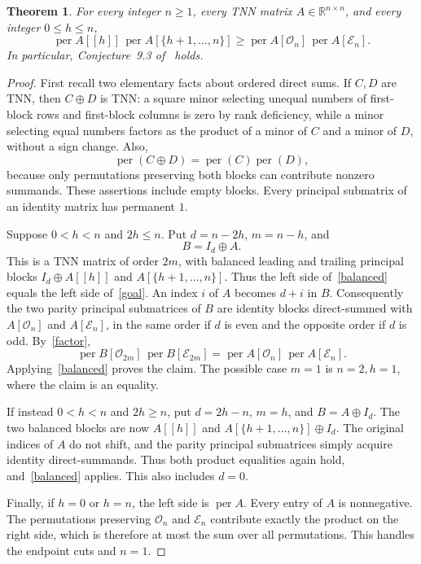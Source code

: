\documentclass[11pt]{article}
\newcommand{\per}{\operatorname{per}}
\newcommand{\OO}{\mathcal O}
\newcommand{\EE}{\mathcal E}
\newtheorem{theorem}{Theorem}
\begin{document}
\begin{theorem}\label{main}
For every integer $n\geq1$, every TNN matrix $A\in\mathbb R^{n\times n}$, and every integer $0\leq h\leq n$,
\begin{equation}\label{goal}
\per A[[h]]\,\per A[\{h+1,\dots,n\}]
\geq\per A[\OO_n]\,\per A[\EE_n].
\end{equation}
In particular, Conjecture~9.3 of~\cite{PSW} holds.
\end{theorem}
\begin{proof}
First recall two elementary facts about ordered direct sums. If $C,D$ are TNN, then $C\oplus D$ is TNN: a square minor selecting unequal numbers of first-block rows and first-block columns is zero by rank deficiency, while a minor selecting equal numbers factors as the product of a minor of $C$ and a minor of $D$, without a sign change. Also,
\begin{equation}\label{factor}
\per(C\oplus D)=\per(C)\per(D),
\end{equation}
because only permutations preserving both blocks can contribute nonzero summands. These assertions include empty blocks. Every principal submatrix of an identity matrix has permanent $1$.

Suppose $0<h<n$ and $2h\leq n$. Put $d=n-2h$, $m=n-h$, and
\[
B=I_d\oplus A.
\]
This is a TNN matrix of order $2m$, with balanced leading and trailing principal blocks $I_d\oplus A[[h]]$ and $A[\{h+1,\dots,n\}]$. Thus the left side of~\eqref{balanced} equals the left side of~\eqref{goal}. An index $i$ of $A$ becomes $d+i$ in $B$. Consequently the two parity principal submatrices of $B$ are identity blocks direct-summed with $A[\OO_n]$ and $A[\EE_n]$, in the same order if $d$ is even and the opposite order if $d$ is odd. By~\eqref{factor},
\[
\per B[\OO_{2m}]\,\per B[\EE_{2m}]
=\per A[\OO_n]\,\per A[\EE_n].
\]
Applying~\eqref{balanced} proves the claim. The possible case $m=1$ is $n=2,h=1$, where the claim is an equality.

If instead $0<h<n$ and $2h\geq n$, put $d=2h-n$, $m=h$, and $B=A\oplus I_d$. The two balanced blocks are now $A[[h]]$ and $A[\{h+1,\dots,n\}]\oplus I_d$. The original indices of $A$ do not shift, and the parity principal submatrices simply acquire identity direct-summands. Thus both product equalities again hold, and~\eqref{balanced} applies. This also includes $d=0$.

Finally, if $h=0$ or $h=n$, the left side is $\per A$. Every entry of $A$ is nonnegative. The permutations preserving $\OO_n$ and $\EE_n$ contribute exactly the product on the right side, which is therefore at most the sum over all permutations. This handles the endpoint cuts and $n=1$.
\end{proof}
\end{document}
